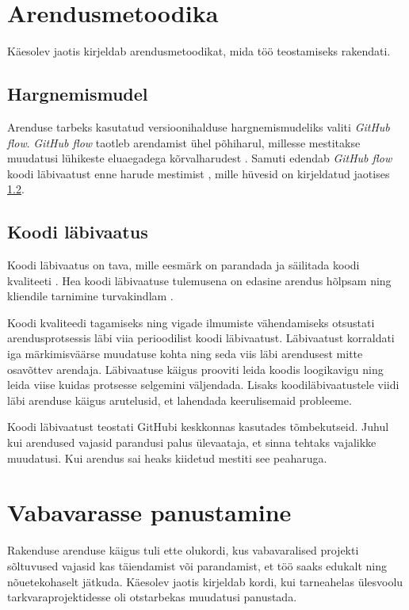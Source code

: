 \section{Arendusmetoodika}

Käesolev jaotis kirjeldab arendusmetoodikat, mida töö teostamiseks rakendati.

\subsection{Hargnemismudel}

Arenduse tarbeks kasutatud versioonihalduse hargnemismudeliks valiti \textit{GitHub flow}. \textit{GitHub flow} taotleb arendamist ühel põhiharul, millesse mestitakse muudatusi lühikeste eluaegadega kõrvalharudest \cite{github-flow}. Samuti edendab \textit{GitHub flow} koodi läbivaatust enne harude mestimist \cite{github-flow}, mille hüvesid on kirjeldatud jaotises \ref{subsec:code-review}.

\subsection{Koodi läbivaatus}\label{subsec:code-review}

Koodi läbivaatus on tava, mille eesmärk on parandada ja säilitada koodi kvaliteeti \cite{gitlab-code-review}. Hea koodi läbivaatuse tulemusena on edasine arendus hõlpsam ning kliendile tarnimine turvakindlam \cite{gitlab-code-review}.

Koodi kvaliteedi tagamiseks ning vigade ilmumiste vähendamiseks otsustati arendusprotsessis läbi viia perioodilist koodi läbivaatust. Läbivaatust korraldati iga märkimisväärse muudatuse kohta ning seda viis läbi arendusest mitte osavõttev arendaja. Läbivaatuse käigus prooviti leida koodis loogikavigu ning leida viise kuidas protsesse selgemini väljendada. Lisaks koodiläbivaatustele viidi läbi arenduse käigus arutelusid, et lahendada keerulisemaid probleeme.

Koodi läbivaatust teostati GitHubi keskkonnas kasutades tõmbekutseid. Juhul kui arendused vajasid parandusi palus ülevaataja, et sinna tehtaks vajalikke muudatusi. Kui arendus sai heaks kiidetud mestiti see peaharuga.

\section{Vabavarasse panustamine}

Rakenduse arenduse käigus tuli ette olukordi, kus vabavaralised projekti sõltuvused vajasid kas täiendamist või parandamist, et töö saaks edukalt ning nõuetekohaselt jätkuda. Käesolev jaotis kirjeldab kordi, kui tarneahelas ülesvoolu tarkvaraprojektidesse oli otstarbekas muudatusi panustada.

